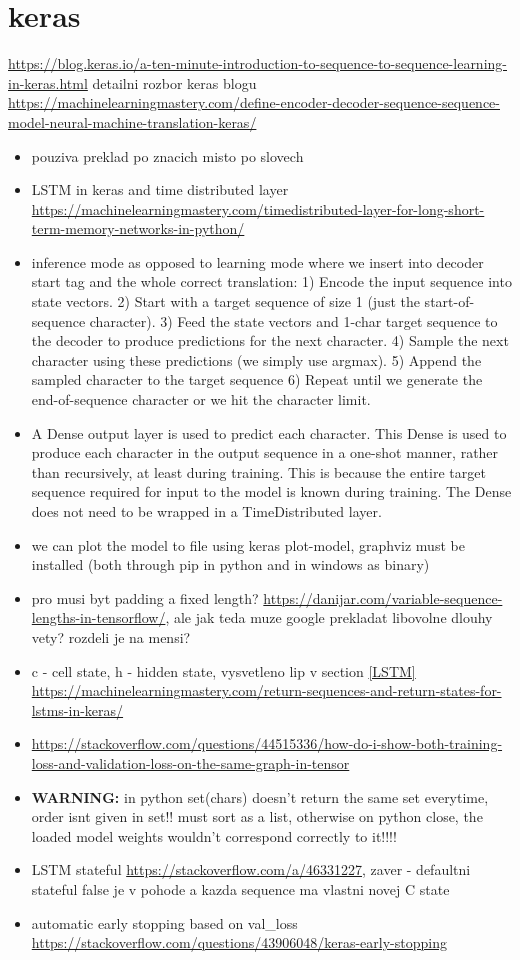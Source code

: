 \section{keras}
\url{https://blog.keras.io/a-ten-minute-introduction-to-sequence-to-sequence-learning-in-keras.html}
detailni rozbor keras blogu
\url{https://machinelearningmastery.com/define-encoder-decoder-sequence-sequence-model-neural-machine-translation-keras/}
\begin{itemize}
  \item pouziva preklad po znacich misto po slovech
  \item LSTM in keras and time distributed layer \url{https://machinelearningmastery.com/timedistributed-layer-for-long-short-term-memory-networks-in-python/}
  \item inference mode as opposed to learning mode where we insert into decoder start tag and the whole correct translation:
    1) Encode the input sequence into state vectors.
    2) Start with a target sequence of size 1 (just the start-of-sequence character).
    3) Feed the state vectors and 1-char target sequence to the decoder to produce predictions for the next character.
    4) Sample the next character using these predictions (we simply use argmax).
    5) Append the sampled character to the target sequence
    6) Repeat until we generate the end-of-sequence character or we hit the character limit.
    \item A Dense output layer is used to predict each character. This Dense is used to produce each character in the output sequence in a one-shot manner, rather than recursively, at least during training. This is because the entire target sequence required for input to the model is known during training. The Dense does not need to be wrapped in a TimeDistributed layer.
    \item we can plot the model to file using keras plot-model, graphviz must be installed (both through pip in python and in windows as binary)
    \item pro musi byt padding a fixed length? \url{https://danijar.com/variable-sequence-lengths-in-tensorflow/}, ale jak teda muze google prekladat libovolne dlouhy vety? rozdeli je na mensi?
    \item c - cell state, h - hidden state, vysvetleno lip v section \ref{LSTM} \url{https://machinelearningmastery.com/return-sequences-and-return-states-for-lstms-in-keras/}
    \item \url{https://stackoverflow.com/questions/44515336/how-do-i-show-both-training-loss-and-validation-loss-on-the-same-graph-in-tensor}
    \item \textbf{WARNING: }in python set(chars) doesn't return the same set everytime, order isnt given in set!! must sort as a list, otherwise on python close, the loaded model weights wouldn't correspond correctly to it!!!!
    \item LSTM stateful \url{https://stackoverflow.com/a/46331227}, zaver - defaultni stateful false je v pohode a kazda sequence ma vlastni novej C state
    \item automatic early stopping based on val\_loss \url{https://stackoverflow.com/questions/43906048/keras-early-stopping}
\end{itemize}


